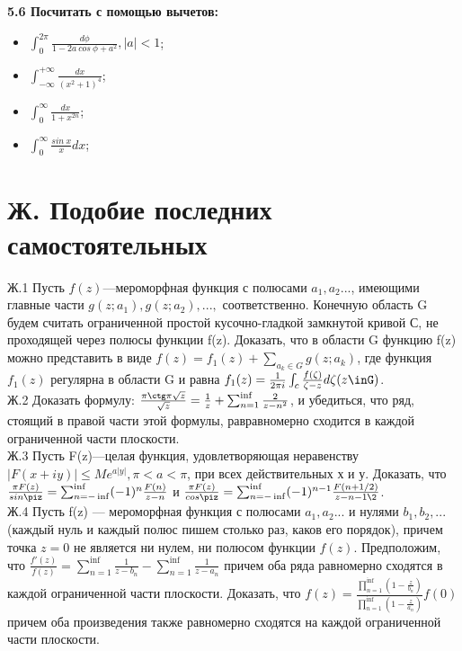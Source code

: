 \documentclass{article}
\begin{document}
\textbf{5.6 Посчитать с помощью вычетов:}
\begin{itemize}
\item $\int_0^{2\pi} \frac{d\phi}{1-2a~cos~\phi+a^2}, \vert a \vert < 1$;
\item $\int_{-\infty}^{+\infty}\frac{dx}{(x^2+1)^4}$;
\item $\int_0^{\infty}\frac{dx}{1+x^{2n}}$;
\item $\int_0^{\infty}\frac{sin~x}{x}dx$;
\end{itemize}

\section*{Ж. Подобие последних самостоятельных}
Ж.1 Пусть $f(z)$—мероморфная функция с полюсами $a_1, a_2 ...$,
имеющими главные части $g(z;a_1), g(z; a_2), ...,$ соответственно. Конечную область G будем считать ограниченной простой кусочно-гладкой замкнутой кривой С, не проходящей через полюсы функции f(z).
Доказать, что в области G функцию f(z) можно представить в виде $f(z)=f_1(z)+\sum_{a_k \in G}g(z;a_k)$,
где функция $f_1(z)$ регулярна в области G и равна $f_1(z)=\frac{1}{2\pi i}\int_c\frac{f(\zeta)}{\zeta-z}d\zeta (z\inG)$.\\
Ж.2 Доказать формулу: $\frac{\pi\ctg \pi\sqrt{z}}{\sqrt{z}}=\frac{1}{z}+\sum_{n=1}^{\inf} \frac{2}{z-n^2}$, и убедиться, что ряд, стоящий в правой части этой формулы, равравномерно сходится в каждой ограниченной части плоскости.\\
Ж.3 Пусть F(z)—целая функция, удовлетворяющая неравенству $\vert F(x+iy)\vert \leq Me^{a\vert y \vert}, \pi <a<\pi$, при всех действительных х и у. Доказать, что $\frac{\pi F(z)}{sin\piz}=\sum_{n=-\inf}^{\inf} (-1)^n\frac{F(n)}{z-n}$  и $\frac{\pi F(z)}{cos\piz}=\sum_{n=-\inf}^{\inf} (-1)^{n-1}\frac{F(n+1/2)}{z-n-1\2}$. \\
Ж.4 Пусть f(z) — мероморфная функция с полюсами $a_1, a_2 ...$ и нулями $b_1, b_2, ...$ (каждый нуль и каждый полюс пишем столько раз, каков его порядок), причем точка $z = 0$ не является ни нулем,
ни полюсом функции $f(z)$. Предположим, что $\frac{f'(z)}{f(z)}=\sum_{n=1}^{\inf} \frac{1}{z-b_n}-\sum_{n=1}^{\inf} \frac{1}{z-a_n}$ причем оба ряда равномерно сходятся в каждой ограниченной части
плоскости. Доказать, что $f(z)=\frac{\prod_{n=1}^{\inf} (1-\frac{z}{b_n})}{\prod_{n=1}^{\inf} (1-\frac{z}{a_n})}f(0)$ причем оба произведения также равномерно сходятся на каждой ограниченной части плоскости.
\end{document}
